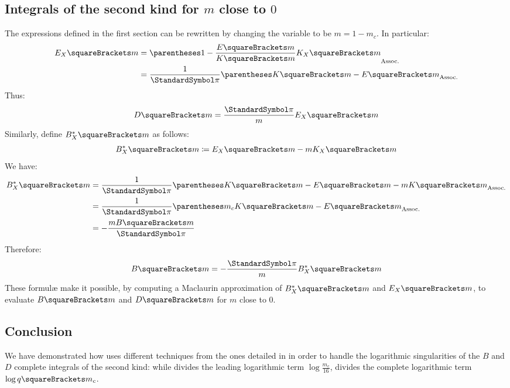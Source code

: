\documentclass[10pt, a4paper, twoside]{basestyle}
\begin{document}
\subsection*{Integrals of the second kind for $m$ close to $0$}
The expressions defined in the first section can be rewritten by changing the variable to be $m = 1 - m_c$.  In particular:
\begin{align*}
E_X\of{m} &= \pa{1 - \frac{E\of{m}}{K\of{m}}K_X\of{m}}\\
&= \frac{1}{\Pi}\pa{K\of{m} - E\of{m}}
\end{align*}
Thus:
\[
D\of{m} = \frac{\Pi}{m}E_X\of{m}
\]
Similarly, define $B_X^*\of{m}$ as follows:
\[
B_X^*\of{m} \DefineAs E_X\of{m} - m K_X\of{m}
\]
We have:
\begin{align*}
B_X^*\of{m} &= \frac{1}{\Pi}\pa{K\of{m} - E\of{m} - m K\of{m}}\\
&= \frac{1}{\Pi}\pa{m_c K\of{m} - E\of{m}}\\
&= -\frac{m B\of{m}}{\Pi}
\end{align*}
Therefore:
\[
B\of{m} = -\frac{\Pi}{m} B_X^*\of{m}
\]
These formulæ make it possible, by computing a Maclaurin approximation of $B_X^*\of{m}$ and $E_X\of{m}$, to evaluate $B\of{m}$
and $D\of{m}$ for $m$ close to $0$.

\subsection*{Conclusion}
We have demonstrated how \cite{Fukushima2018} uses different techniques from the ones detailed in \cite{Fukushima2011a} in order to handle the 
logarithmic singularities of the $B$ and $D$ complete integrals of the second kind: while \cite{Fukushima2011a} divides the leading logarithmic term $\log \frac{m_c}{16}$, \cite{Fukushima2018} divides the complete logarithmic term $\log q\of{m_c}$.
\end{document}
